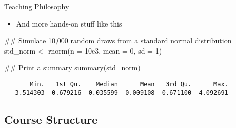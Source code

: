 \documentclass[12pt,ignorenonframetext,aspectratio=169]{beamer}
\providecommand{\tightlist}{%
	\setlength{\itemsep}{0.25em}\setlength{\parskip}{0pt}}
\newenvironment{Shaded}{\linespread{1}}{}
\newcommand{\AttributeTok}[1]{#1}
\newcommand{\DecValTok}[1]{#1}
\newcommand{\DocumentationTok}[1]{\textcolor[rgb]{0.00,0.50,0.00}{#1}}
\newcommand{\FloatTok}[1]{#1}
\newcommand{\FunctionTok}[1]{#1}
\newcommand{\NormalTok}[1]{#1}
\newcommand{\OtherTok}[1]{\textcolor[rgb]{1.00,0.25,0.00}{#1}}
\begin{document}
\begin{frame}[fragile]{Teaching Philosophy}
\protect\hypertarget{teaching-philosophy-1}{}
\begin{itemize}[<+->]
\tightlist
\item
  And more hands-on stuff like this
\end{itemize}

\begin{Shaded}
\begin{Highlighting}[]
\DocumentationTok{\#\# Simulate 10,000 random draws from a standard normal distribution}
\NormalTok{std\_norm }\OtherTok{\textless{}{-}} \FunctionTok{rnorm}\NormalTok{(}\AttributeTok{n =} \FloatTok{10e3}\NormalTok{, }\AttributeTok{mean =} \DecValTok{0}\NormalTok{, }\AttributeTok{sd =} \DecValTok{1}\NormalTok{)}

\DocumentationTok{\#\# Print a summary}
\FunctionTok{summary}\NormalTok{(std\_norm)}
\end{Highlighting}
\end{Shaded}

\begin{verbatim}
       Min.   1st Qu.    Median      Mean   3rd Qu.      Max. 
  -3.514303 -0.679216 -0.035599 -0.009108  0.671100  4.092691
\end{verbatim}
\end{frame}

\hypertarget{course-structure}{%
\subsection{Course Structure}\label{course-structure}}
\end{document}
